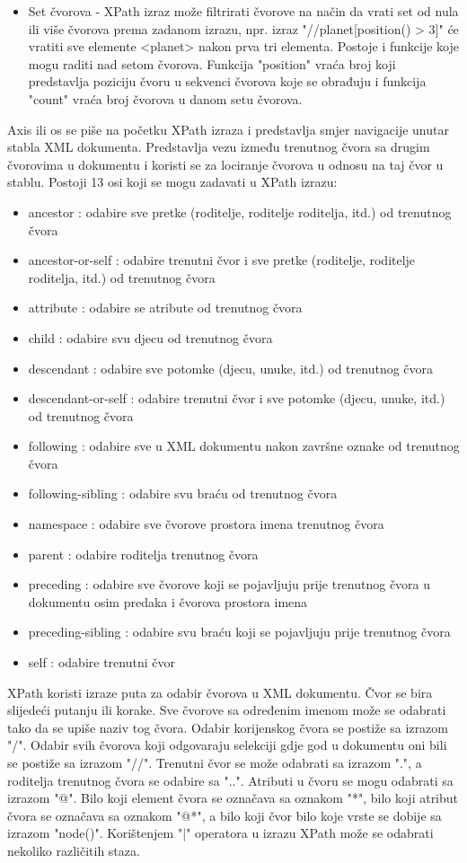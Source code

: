 \documentclass{foi}
\begin{document}
\begin{itemize}
\item Set čvorova - XPath izraz može filtrirati čvorove na način da vrati set od nula ili više čvorova prema zadanom izrazu, npr. izraz "//planet[position() > 3]" će vratiti sve elemente <planet> nakon prva tri elementa. Postoje i funkcije koje mogu raditi nad setom čvorova. Funkcija "position" vraća broj koji predstavlja poziciju čvoru u sekvenci čvorova koje se obrađuju i funkcija "count" vraća broj čvorova u danom setu čvorova.
\end{itemize}

Axis ili os se piše na početku XPath izraza i predstavlja smjer navigacije unutar stabla XML dokumenta. Predstavlja vezu između trenutnog čvora sa drugim čvorovima u dokumentu i koristi se za lociranje čvorova u odnosu na taj čvor u stablu. Postoji 13 osi koji se mogu zadavati u XPath izrazu:
\begin{itemize}
\item ancestor : odabire sve pretke (roditelje, roditelje roditelja, itd.) od trenutnog čvora
\item ancestor-or-self : odabire trenutni čvor i sve pretke (roditelje, roditelje roditelja, itd.) od trenutnog čvora
\item attribute : odabire se atribute od trenutnog čvora
\item child : odabire svu djecu od trenutnog čvora
\item descendant : odabire sve potomke (djecu, unuke, itd.) od trenutnog čvora
\item descendant-or-self : odabire trenutni čvor i sve potomke (djecu, unuke, itd.) od trenutnog čvora
\item following : odabire sve u XML dokumentu nakon završne oznake od trenutnog čvora
\item following-sibling : odabire svu braću od trenutnog čvora
\item namespace : odabire sve čvorove prostora imena trenutnog čvora
\item parent : odabire roditelja trenutnog čvora
\item preceding : odabire sve čvorove koji se pojavljuju prije trenutnog čvora u dokumentu osim predaka i čvorova prostora imena
\item preceding-sibling : odabire svu braću koji se pojavljuju prije trenutnog čvora
\item self : odabire trenutni čvor
\end{itemize}

XPath koristi izraze puta za odabir čvorova u XML dokumentu. Čvor se bira slijedeći putanju ili korake. Sve čvorove sa određenim imenom može se odabrati tako da se upiše naziv tog čvora. Odabir korijenskog čvora se postiže sa izrazom "/". Odabir svih čvorova koji odgovaraju selekciji gdje god u dokumentu oni bili se postiže sa izrazom "//". Trenutni čvor se može odabrati sa izrazom ".", a roditelja trenutnog čvora se odabire sa "..". Atributi u čvoru se mogu odabrati sa izrazom "@". Bilo koji element čvora se označava sa oznakom "*", bilo koji atribut čvora se označava sa oznakom "@*", a bilo koji čvor bilo koje vrste se dobije sa izrazom "node()". Korištenjem "|" operatora u izrazu XPath može se odabrati nekoliko različitih staza. \cite{XPath}
\end{document}
